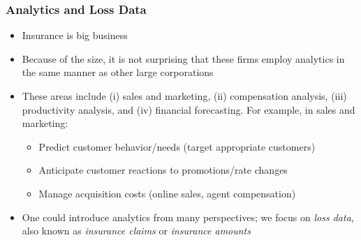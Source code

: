 \documentclass[serif,10pt]{beamer}
\begin{document}
\begin{frame}
\frametitle{Analytics and Loss Data}
 \begin{itemize}
\item  Insurance is big business \vspace{2mm}

 \item  Because of the size, it is not surprising that these firms employ analytics in the same manner as other large
 corporations \vspace{2mm}

  \item  These areas include (i) sales and marketing, (ii)  compensation analysis, (iii) productivity analysis, and (iv) financial forecasting. For example, in sales and
  marketing: \vspace{2mm}

 \begin{itemize}
 \item Predict customer behavior/needs (target appropriate
 customers) \vspace{2mm}
 \item Anticipate customer reactions to promotions/rate changes \vspace{2mm}
 \item Manage acquisition costs (online sales, agent compensation) \vspace{2mm}
\end{itemize}
\item One could introduce analytics from many perspectives; we focus on \textit{loss data}, also known as \textit{insurance claims} or \textit{insurance amounts}
\end{itemize}
\end{frame}
\end{document}
